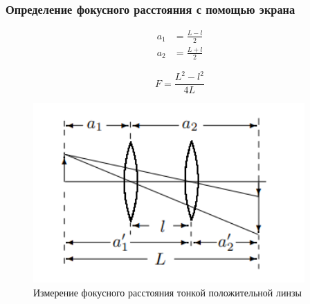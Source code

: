 \documentclass[10pt,pdf,hyperref={unicode}]{beamer}
\begin{document}
	\begin{frame}
\frametitle{Определение фокусного расстояния с помощью экрана}

\begin{align*}
	a_1 &= \frac{L - l}{2} \\
	a_2 &= \frac{L + l}{2}
\end{align*}


\begin{equation}
	F = \frac{L^2 - l^2}{4L}
\end{equation}

\begin{figure}[H]
	\centering
	\includegraphics[width=0.4\linewidth]{3}
	\caption{Измерение фокусного расстояния тонкой положительной линзы}
	\label{fig:1_3}
\end{figure}

\end{frame}
\end{document}
